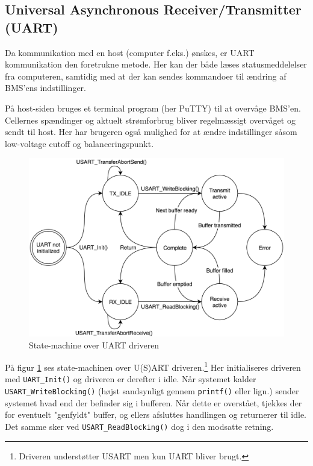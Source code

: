 
\subsection{Universal Asynchronous Receiver/Transmitter (UART)}
Da kommunikation med en host (computer f.eks.) ønskes, er UART kommunikation den foretrukne metode. Her kan der både læses statusmeddelelser fra computeren, samtidig med at der kan sendes kommandoer til ændring af BMS'ens indstillinger. \\


På host-siden bruges et terminal program (her PuTTY) til at overvåge BMS'en. Cellernes spændinger og aktuelt strømforbrug bliver regelmæssigt overvåget og sendt til host. Her har brugeren også mulighed for at ændre indstillinger såsom low-voltage cutoff og balanceringspunkt.

\begin{figure}[h]
	\centering
	\includegraphics[width=12cm]{billeder/UART_sm.png}
	\caption{State-machine over UART driveren}
	\label{fig:UART_sm}
\end{figure}

På figur \ref{fig:UART_sm} ses state-machinen over U(S)ART driveren.\footnote{Driveren understøtter USART men kun UART bliver brugt.} Her initialiseres driveren med \verb|UART_Init()| og driveren er derefter i idle. Når systemet kalder \verb|USART_WriteBlocking()| (højst sandsynligt gennem \verb|printf()| eller lign.) sender systemet hvad end der befinder sig i bufferen. Når dette er overstået, tjekkes der for eventuelt "genfyldt" buffer, og ellers afsluttes handlingen og returnerer til idle. Det samme sker ved \verb|USART_ReadBlocking()| dog i den modsatte retning. 

